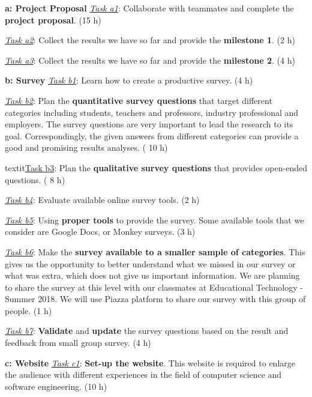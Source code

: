 \documentclass{sigchi}
\begin{document}
\textbf{a: Project Proposal}\newline
\textit{\underline{Task a1}}: Collaborate with teammates and complete the \textbf{project proposal}. (15 h)

\textit{\underline{Task a2}}: Collect the results we have so far and provide the \textbf{milestone 1}. (2 h)

\textit{\underline{Task a3}}: Collect the results we have so far and provide the \textbf{milestone 2}. (4 h)

\textbf{b: Survey}\newline
\textit{\underline{Task b1}}: Learn how to create a productive survey. (4 h)

\textit{\underline{Task b2}}: Plan the \textbf{quantitative survey questions} that target different categories including students, teachers and professors, industry professional and employers. The survey questions are very important to lead the research to its goal. Correspondingly, the given answers from different categories can provide a good and promising results analyses. ( 10 h)

textit{\underline{Task b3}}: Plan the \textbf{qualitative survey questions} that provides open-ended questions. ( 8 h)

\textit{\underline{Task b4}}: Evaluate available online survey tools. (2 h)

\textit{\underline{Task b5}}: Using \textbf{proper tools} to provide the survey. Some available tools that we consider are Google Docs, or Monkey surveys. (3 h)

\textit{\underline{Task b6}}: Make the \textbf{survey available to a smaller sample of categories}. This gives us the opportunity to better understand what we missed in our survey or what was extra, which does not give us important information. We are planning to share the survey at this level with our classmates at Educational Technology - Summer 2018. We will use Piazza platform to share our survey with this group of people. (1 h)

\textit{\underline{Task b7}}: \textbf{Validate} and \textbf{update} the survey questions based on the result and feedback from small group survey. (4 h)\newline


\textbf{c: Website}\newline
\textit{\underline{Task c1}}: \textbf{Set-up the website}. This website is required to enlarge the audience with different  experiences in the field of computer science and software engineering. (10 h)
\end{document}

